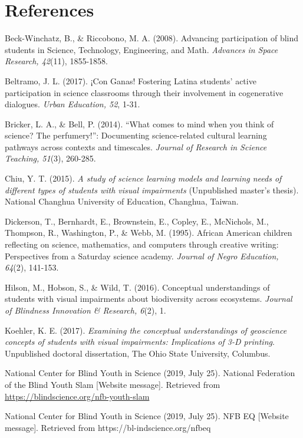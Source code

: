 \documentclass[11.5pt]{sig-alternate} %
\begin{document}
\section*{References}\par 

\leftskip 0.25in
\parindent -0.25in 

Beck-Winchatz, B., \& Riccobono, M. A. (2008). Advancing participation of blind students in Science, Technology, Engineering, and Math. \textit{Advances in Space Research, 42}(11), 1855-1858.

Beltramo, J. L. (2017). ¡Con Ganas! Fostering Latina students’ active participation in science classrooms through their involvement in cogenerative dialogues. \textit{Urban Education, 52}, 1-31.

Bricker, L. A., \& Bell, P. (2014). “What comes to mind when you think of science? The perfumery!”: Documenting science-related cultural learning pathways across contexts and timescales. \textit{Journal of Research in Science Teaching, 51}(3), 260-285.

Chiu, Y. T. (2015). \textit{A study of science learning models and learning needs of different types of students with visual impairments} (Unpublished master’s thesis). National Changhua University of Education, Changhua, Taiwan.

Dickerson, T., Bernhardt, E., Brownstein, E., Copley, E., McNichols, M., Thompson, R., Washington, P., \& Webb, M. (1995). African American children reflecting on science, mathematics, and computers through creative writing: Perspectives from a Saturday science academy. \textit{Journal of Negro Education, 64}(2), 141-153.

Hilson, M., Hobson, S., \& Wild, T. (2016). Conceptual understandings of students with visual impairments about biodiversity across ecosystems. \textit{Journal of Blindness Innovation \& Research, 6}(2), 1.

Koehler, K. E. (2017). \textit{Examining the conceptual understandings of geoscience concepts of students with visual impairments: Implications of 3-D printing}. Unpublished doctoral dissertation, The Ohio State University, Columbus.

National Center for Blind Youth in Science (2019, July 25). National Federation of the Blind Youth Slam [Website message]. Retrieved from \url{https://blindscience.org/nfb-youth-slam}

National Center for Blind Youth in Science (2019, July 25). NFB EQ [Website message]. Retrieved from https://bl-indscience.org/nfbeq
\end{document}
